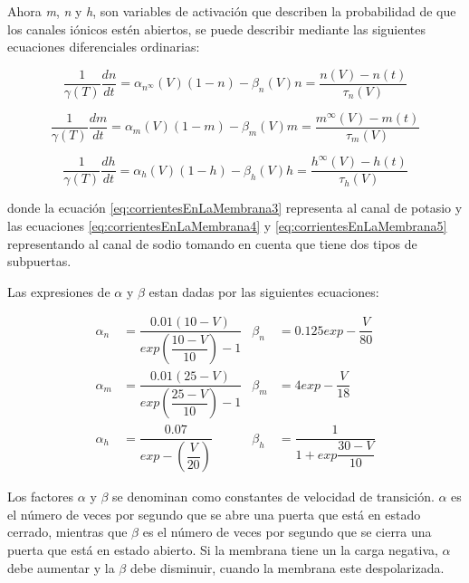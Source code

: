Ahora \emph{m}, \emph{n} y \emph{h}, son variables de activación que describen la probabilidad de que los canales iónicos estén abiertos, se puede describir mediante las siguientes ecuaciones diferenciales ordinarias:

\begin{equation}
  \dfrac{1}{\gamma(T)}\dfrac{dn}{dt} =  \alpha_{n^\infty} (V)(1 - n) - \beta_{n} (V) n = \dfrac{n(V)-n(t)}{\tau_{n}(V)}
  \label{eq:corrientesEnLaMembrana3}
\end{equation}

\begin{equation}
  \dfrac{1}{\gamma(T)}\dfrac{dm}{dt} =  \alpha_{m} (V)(1 - m) - \beta_{m} (V) m = \dfrac{m^\infty(V)-m(t)}{\tau_{m}(V)}
  \label{eq:corrientesEnLaMembrana4}
\end{equation}

\begin{equation}
  \dfrac{1}{\gamma(T)}\dfrac{dh}{dt} =  \alpha_{h} (V)(1 - h) - \beta_{h} (V) h = \dfrac{h^\infty(V)-h(t)}{\tau_{h}(V)}
  \label{eq:corrientesEnLaMembrana5}
\end{equation}

donde la ecuación \ref{eq:corrientesEnLaMembrana3} representa al canal de potasio y las ecuaciones \ref{eq:corrientesEnLaMembrana4} y \ref{eq:corrientesEnLaMembrana5} representando al canal de sodio tomando en cuenta que tiene dos tipos de subpuertas.

Las expresiones de \(\alpha\) y \(\beta\) estan dadas por las siguientes ecuaciones:

\begin{align*}
\alpha_{n}&=\dfrac{0.01(10-V)}{exp(\dfrac{10-V}{10})-1}           &  \beta_{n}&=0.125exp-\dfrac{V}{80}\\
\alpha_{m}&=\dfrac{0.01(25-V)}{exp(\dfrac{25-V}{10})-1}                    &  \beta_{m}&=4exp-\dfrac{V}{18}\\
\alpha_{h}&=\dfrac{0.07}{exp-(\dfrac{V}{20})}              &  \beta_{h}&=\dfrac{1}{1+exp\dfrac{30-V}{10}}
\end{align*}

Los factores \(\alpha\) y \(\beta\) se denominan como constantes de velocidad de transición. \(\alpha\) es el número de veces por segundo que se abre una puerta que está en estado cerrado, mientras que \(\beta\) es el número de veces por segundo que se cierra una puerta que está en estado abierto. Si la membrana tiene un la carga negativa, \(\alpha\) debe aumentar y la \(\beta\) debe disminuir, cuando la membrana este despolarizada.

